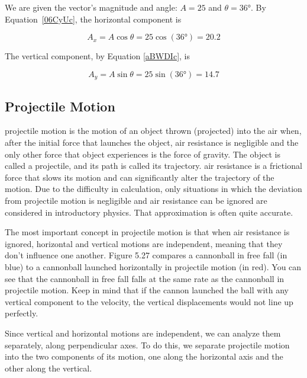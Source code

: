 \documentclass[main.tex]{subfiles}
\begin{document}
\Solution We are given the vector's magnitude and angle: $A = 25$ and $\theta=\ang{36}$. By Equation~\eqref{06CyUc}, the horizontal component is

\begin{equation*}
    A_x = A \cos{\theta} = 25 \cos{(\ang{36})} = 20.2
\end{equation*}

The vertical component, by Equation \eqref{aBWDIc}, is

\begin{equation*}
    A_y = A \sin{\theta} = 25 \sin{(\ang{36})} = 14.7
\end{equation*}

\solutionEnd

\subsection{Projectile Motion} \label{tMF7JY}

\Gls{projectile motion} is the motion of an object thrown (projected) into the air when, after the initial force that launches the object, air resistance is negligible and the only other force that object experiences is the force of gravity. The object is called a \gls{projectile}, and its path is called its \gls{trajectory}. \Gls{air resistance} is a frictional force that slows its motion and can significantly alter the trajectory of the motion. Due to the difficulty in calculation, only situations in which the deviation from projectile motion is negligible and air resistance can be ignored are considered in introductory physics. That approximation is often quite accurate.

\vspace{1em}

The most important concept in projectile motion is that when air resistance is ignored, horizontal and vertical motions are independent, meaning that they don't influence one another. Figure 5.27 compares a cannonball in free fall (in blue) to a cannonball launched horizontally in projectile motion (in red). You can see that the cannonball in free fall falls at the same rate as the cannonball in projectile motion. Keep in mind that if the cannon launched the ball with any vertical component to the velocity, the vertical displacements would not line up perfectly.

\vspace{1em}

Since vertical and horizontal motions are independent, we can analyze them separately, along perpendicular axes. To do this, we separate projectile motion into the two components of its motion, one along the horizontal axis and the other along the vertical.
\end{document}
